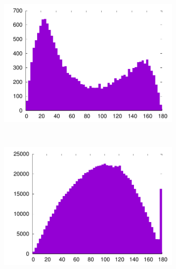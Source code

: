 	\newcommand{\subImgWaStats}{0.49\textwidth}
	\begin{figure}[htb]
		\begin{subfigure}[t]{\subImgWaStats}
			\centering
			\includegraphics[width=\textwidth]{figures/ch3/02_DA_all_angles}
			\caption{}
			\label{fig:02_DA_all_angles}
		\end{subfigure}
		~
		\begin{subfigure}[t]{\subImgWaStats}
			\centering
			\includegraphics[width=\textwidth]{figures/ch3/148L_all_angles}
			\caption{}
			\label{fig:148L_all_angles}
		\end{subfigure}
		~
		\begin{subfigure}[t]{\subImgWaStats}
			\centering

\end{subfigure}
\end{figure}
